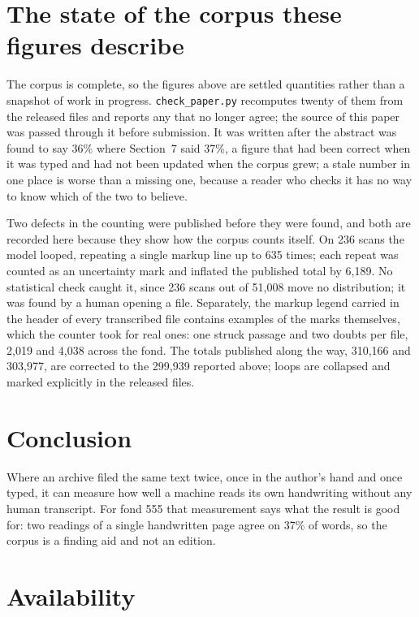 \documentclass[11pt,a4paper]{article}
\begin{document}
\section{The state of the corpus these figures describe}\label{the-state-of-the-corpus-these-figures-describe}

The corpus is complete, so the figures above are settled quantities rather
than a snapshot of work in progress. \texttt{check\_paper.py} recomputes twenty of
them from the released files and reports any that no longer agree; the source
of this paper was passed through it before submission. It was written after
the abstract was found to say 36\% where Section~7 said 37\%, a figure that had
been correct when it was typed and had not been updated when the corpus grew;
a stale number in one place is worse than a missing one, because a reader who
checks it has no way to know which of the two to believe.

Two defects in the counting were published before they were found, and both
are recorded here because they show how the corpus counts itself. On 236 scans
the model looped, repeating a single markup line up to 635 times; each repeat
was counted as an uncertainty mark and inflated the published total by 6,189.
No statistical check caught it, since 236 scans out of 51,008 move no
distribution; it was found by a human opening a file. Separately, the markup
legend carried in the header of every transcribed file contains examples of
the marks themselves, which the counter took for real ones: one struck passage
and two doubts per file, 2,019 and 4,038 across the fond. The totals published
along the way, 310,166 and 303,977, are corrected to the 299,939 reported
above; loops are collapsed and marked explicitly in the released files.

\section{Conclusion}\label{conclusion}

Where an archive filed the same text twice, once in the author's hand and once
typed, it can measure how well a machine reads its own handwriting without any
human transcript. For fond 555 that measurement says what the result is good
for: two readings of a single handwritten page agree on 37\% of words, so the
corpus is a finding aid and not an edition.

\section{Availability}\label{availability}
\end{document}
